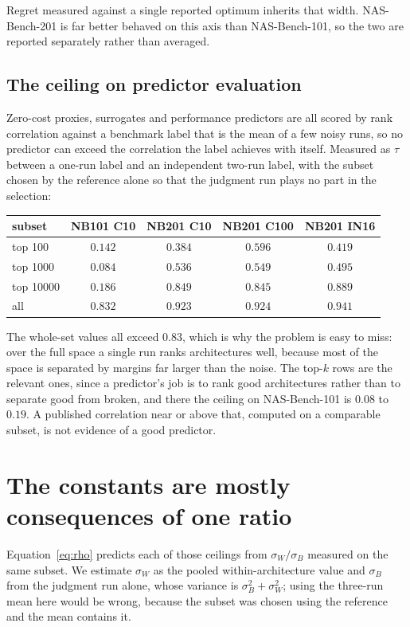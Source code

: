 \documentclass[11pt]{article}
\begin{document}
Regret measured against a single reported optimum inherits that width. NAS-Bench-201 is far better
behaved on this axis than NAS-Bench-101, so the two are reported separately rather than averaged.

\subsection{The ceiling on predictor evaluation}

Zero-cost proxies, surrogates and performance predictors are all scored by rank correlation against a
benchmark label that is the mean of a few noisy runs, so no predictor can exceed the correlation the
label achieves with itself. Measured as $\tau$ between a one-run label and an independent two-run label,
with the subset chosen by the reference alone so that the judgment run plays no part in the selection:

\begin{center}\small
\begin{tabular}{lcccc}
\toprule
subset & NB101 C10 & NB201 C10 & NB201 C100 & NB201 IN16 \\
\midrule
top 100    & $0.142$ & $0.384$ & $0.596$ & $0.419$ \\
top 1000   & $0.084$ & $0.536$ & $0.549$ & $0.495$ \\
top 10000  & $0.186$ & $0.849$ & $0.845$ & $0.889$ \\
all        & $0.832$ & $0.923$ & $0.924$ & $0.941$ \\
\bottomrule
\end{tabular}
\end{center}

The whole-set values all exceed $0.83$, which is why the problem is easy to miss: over the full space a
single run ranks architectures well, because most of the space is separated by margins far larger than
the noise. The top-$k$ rows are the relevant ones, since a predictor's job is to rank good architectures
rather than to separate good from broken, and there the ceiling on NAS-Bench-101 is $0.08$ to $0.19$. A
published correlation near or above that, computed on a comparable subset, is not evidence of a good
predictor.

\section{The constants are mostly consequences of one ratio}\label{sec:law}

Equation~\eqref{eq:rho} predicts each of those ceilings from $\sigma_W/\sigma_B$ measured on the same
subset. We estimate $\sigma_W$ as the pooled within-architecture value and $\sigma_B$ from the judgment
run alone, whose variance is $\sigma_B^2+\sigma_W^2$; using the three-run mean here would be wrong,
because the subset was chosen using the reference and the mean contains it.
\end{document}

